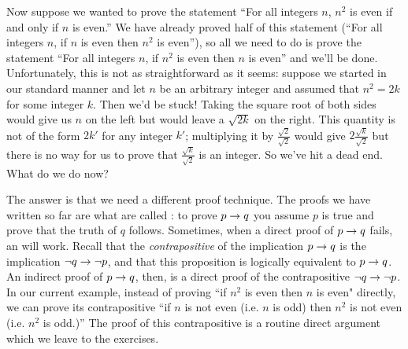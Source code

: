 Now suppose we wanted to prove the statement ``For all integers $n$, $n^2$ is even if
and only if $n$ is even.''  We have already proved half of this
statement (``For all integers $n$, if $n$ is even then $n^2$ is even''), so
all we need to do is prove the statement
``For all integers $n$, if $n^2$ is even then $n$ is even'' and we'll be done.
Unfortunately, this is not as straightforward as it seems: suppose we started
in our standard manner and let $n$
be an arbitrary integer and assumed that $n^2=2k$ for some integer $k$.  Then we'd be
stuck!  Taking the square root of both sides would give us $n$ on the left but would
leave a $\sqrt{2k}$ on the right. This quantity is not of the form $2k'$ for any
integer $k'$; multiplying it by $\frac{\sqrt{2}}{\sqrt{2}}$ would give $2\frac{\sqrt{k}}
{\sqrt{2}}$ but there is no way for us to prove that $\frac{\sqrt{k}}
{\sqrt{2}}$ is an integer.  So we've hit a dead end.  What do we do now?

The answer is that we need a different proof technique.  The proofs we have written
so far are what are called : to prove $p \rightarrow q$ you assume
$p$ is true and prove that the truth of $q$ follows.
Sometimes, when a direct proof of $p \rightarrow q$ fails, an  will
work.  Recall that the {\em contrapositive} of the implication $p \rightarrow q$
is the implication $\lnot q \rightarrow \lnot p$, and that this proposition is
logically equivalent to $p \rightarrow q$. An indirect proof of 
$p \rightarrow q$, then, is a direct proof of the contrapositive 
$\lnot q \rightarrow \lnot p$.  In our current example, instead of proving
``if $n^2$ is even then $n$ is even" directly, we can prove its contrapositive
``if $n$ is not even (i.e. $n$ is odd) then $n^2$ is not even (i.e. $n^2$ is odd.)''
The proof of this contrapositive is a routine direct argument which we leave to the
exercises.

